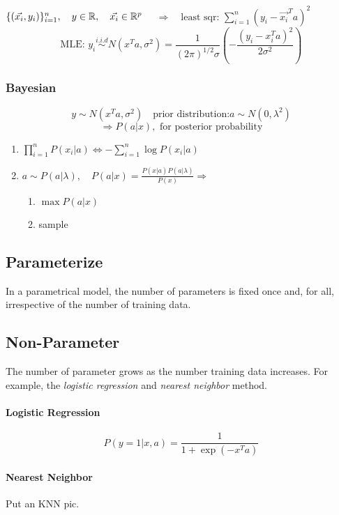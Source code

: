 	$\{(\vec{x_i},y_i)\}_{i=1}^n,\quad y\in\mathbb{R}, \quad \vec{x_i}\in \mathbb{R}^p$ 
	$\quad \Rightarrow \quad \text{least sqr: }\sum\limits_{i=1}^{n}(y_i - \vec{x_i}^Ta)^2$\\
	$$\text{MLE: } y_i\stackrel{i.i.d}{\sim}N(x^Ta,\sigma^2)=\frac{1}{(2\pi)^{1/2}\sigma}\left( -\frac{(y_i - x_i^Ta)^2}{2\sigma^2}\right)$$
	
	\subsubsection{Bayesian}
	$$y\sim N(x^Ta, \sigma^2) \quad \text{prior distribution:} a\sim N(0, \lambda^2)$$
	$$\Rightarrow P(a|x), \text{ for posterior probability}$$
	\begin{enumerate}[(1)]
		\item $\prod_{i=1}^{n}P(x_i|a)\Leftrightarrow-\sum_{i=1}^{n}\log P(x_i|a)$
		\item $a\sim P(a|\lambda), \quad P(a|x)=\frac{P(x|a)P(a|\lambda)}{P(x)}\Rightarrow $ \begin{enumerate}[i]
			\item $\max P(a|x)$
			\item sample
		\end{enumerate}
	\end{enumerate}


\subsection{Parameterize}
In a parametrical model, the number of parameters is fixed once and, for all, irrespective of the number of training data.

\subsection{Non-Parameter}
The number of parameter grows as the number training data increases. For example, the \textit{logistic regression} and \textit{nearest neighbor} method.
\paragraph{Logistic Regression}
$$P(y=1|x,a)=\frac{1}{1+\exp(-x^Ta)}$$
\paragraph{Nearest Neighbor}
\leavevmode
Put an KNN pic.

